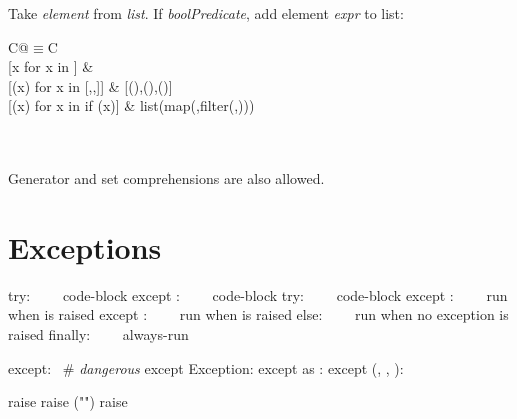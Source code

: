 \documentclass{refcard}
\begin{document}
Take \emph{element} from \emph{list}.
If \emph{boolPredicate}, add element \emph{expr} to list:\\
\begin{tabular}{C@{\s$\equiv$\s}C}
	 \\[1ex]
	{[}x for x in ]                   &  \\
	{[}(x) for x in [,,]]    & [(),(),()] \\
	{[}(x) for x in  if (x)]    & list(map(,filter(,))) \\
 \\
 \\
\end{tabular}
Generator  and set  comprehensions
	are also allowed.



\section{Exceptions}

\begin{ldesc}
		try: \li
		~~~~code-block \li
		except : \li
		~~~~code-block \li
		try: \li
		~~~~code-block \li
		except : \li
		~~~~\textnormal{run when  is raised} \li
		except : \li
		~~~~\textnormal{run when  is raised} \li
		else: \li
		~~~~\textnormal{run when no exception is raised} \li
		finally: \li
		~~~~always-run \li

	   except: ~\# \textnormal{\emph{dangerous}}
	  except Exception:
	\li[catch as]                  except  as :
	 except (, , ): \li
	  

	       raise 
	    raise ("")
	  raise
\end{ldesc}
\end{document}
